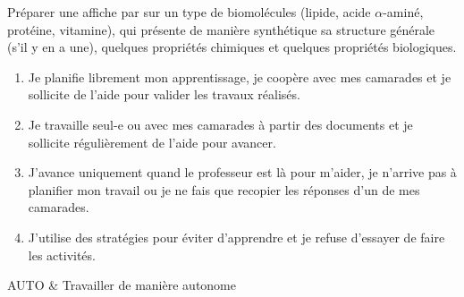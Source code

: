 \begin{programmeSeance}
\end{programmeSeance}
\vspace*{1.2 cm}

\begin{programmeSeance}[2]
\end{programmeSeance}


\begin{tacheFinale}
  Préparer une affiche par  sur un type de biomolécules (lipide, acide $\alpha$-aminé, protéine, vitamine), qui présente de manière synthétique sa structure générale (s'il y en a une), quelques propriétés chimiques et quelques propriétés biologiques.
\end{tacheFinale}




\begin{enumerate}[label = \Alph*]
  \item Je planifie librement mon apprentissage, je coopère avec mes camarades et je sollicite de l'aide pour valider les travaux réalisés.
  \item Je travaille seul-e ou avec mes camarades à partir des documents et je sollicite régulièrement de l'aide pour avancer.
  \item J'avance uniquement quand le professeur est là pour m'aider, je n'arrive pas à planifier mon travail ou je ne fais que recopier les réponses d'un de mes camarades.
  \item J'utilise des stratégies pour éviter d'apprendre et je refuse d'essayer de faire les activités.
\end{enumerate}

\begin{tableauCompetences}
  AUTO & Travailler de manière autonome \\
\end{tableauCompetences}